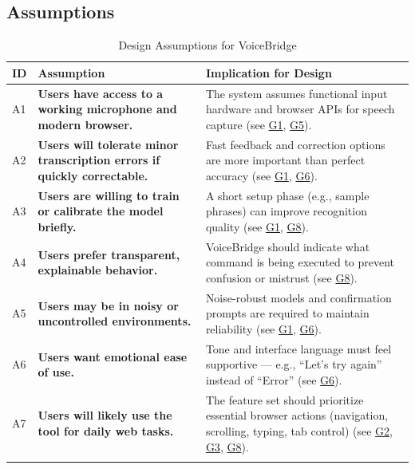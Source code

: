 \documentclass[11pt]{article}
\begin{document}
\subsection{Assumptions}
\begin{table}[H]
\centering
\begin{tabularx}{\textwidth}{p{1cm}p{6cm}X}
\toprule {\textbf{ID}} & {\textbf{Assumption}} & {\textbf{Implication for Design}}\\
\midrule
A1 & \textbf{Users have access to a working microphone and modern browser.} & The system assumes functional input hardware and browser APIs for speech capture (see \hyperref[tab:project-goals]{G1}, \hyperref[tab:project-goals]{G5}). \\ \hline
A2 & \textbf{Users will tolerate minor transcription errors if quickly correctable.} & Fast feedback and correction options are more important than perfect accuracy (see \hyperref[tab:project-goals]{G1}, \hyperref[tab:project-goals]{G6}). \\ \hline
A3 & \textbf{Users are willing to train or calibrate the model briefly.} & A short setup phase (e.g., sample phrases) can improve recognition quality (see \hyperref[tab:project-goals]{G1}, \hyperref[tab:project-goals]{G8}). \\ \hline
A4 & \textbf{Users prefer transparent, explainable behavior.} & VoiceBridge should indicate what command is being executed to prevent confusion or mistrust (see \hyperref[tab:project-goals]{G8}). \\ \hline
A5 & \textbf{Users may be in noisy or uncontrolled environments.} & Noise-robust models and confirmation prompts are required to maintain reliability (see \hyperref[tab:project-goals]{G1}, \hyperref[tab:project-goals]{G6}). \\ \hline
A6 & \textbf{Users want emotional ease of use.} & Tone and interface language must feel supportive — e.g., “Let’s try again” instead of “Error” (see \hyperref[tab:project-goals]{G6}). \\ \hline
A7 & \textbf{Users will likely use the tool for daily web tasks.} & The feature set should prioritize essential browser actions (navigation, scrolling, typing, tab control) (see \hyperref[tab:project-goals]{G2}, \hyperref[tab:project-goals]{G3}, \hyperref[tab:project-goals]{G8}). \\
\bottomrule
\caption{Design Assumptions for VoiceBridge}
\end{tabularx}
\end{table}
\end{document}
